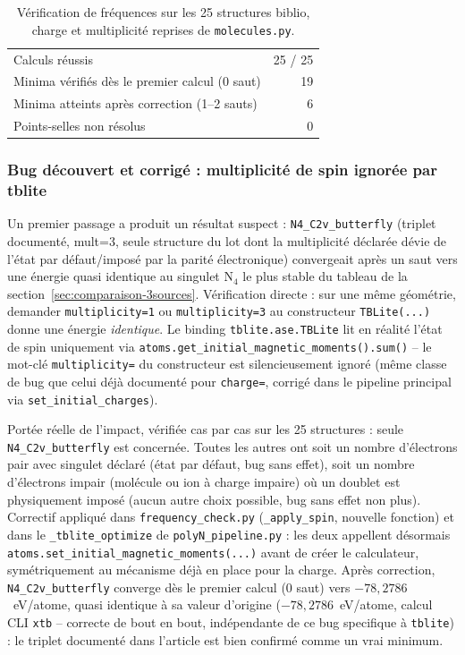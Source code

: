 \documentclass[11pt,a4paper]{article}
\begin{document}
\begin{table}[H]
\centering
\begin{tabular}{lr}
\toprule
Calculs r\'eussis & 25 / 25 \\
Minima v\'erifi\'es d\`es le premier calcul (0 saut) & 19 \\
Minima atteints apr\`es correction (1--2 sauts) & 6 \\
Points-selles non r\'esolus & 0 \\
\bottomrule
\end{tabular}
\caption{V\'erification de fr\'equences sur les 25 structures biblio,
charge et multiplicit\'e reprises de \texttt{molecules.py}.}
\label{tab:freq-biblio}
\end{table}

\subsubsection{Bug d\'ecouvert et corrig\'e : multiplicit\'e de spin ignor\'ee par tblite}
\label{sssec:bug-multiplicity}

Un premier passage a produit un r\'esultat suspect : \texttt{N4\_C2v\_butterfly}
(triplet document\'e, mult=3, seule structure du lot dont la multiplicit\'e
d\'eclar\'ee d\'evie de l'\'etat par d\'efaut/impos\'e par la parit\'e
\'electronique) convergeait apr\`es un saut vers une \'energie quasi
identique au singulet N$_4$ le plus stable du tableau de la
section~\ref{sec:comparaison-3sources}. V\'erification directe : sur une
m\^eme g\'eom\'etrie, demander \texttt{multiplicity=1} ou
\texttt{multiplicity=3} au constructeur \texttt{TBLite(...)} donne une
\'energie \emph{identique}. Le binding \texttt{tblite.ase.TBLite} lit en
r\'ealit\'e l'\'etat de spin uniquement via
\texttt{atoms.get\_initial\_magnetic\_moments().sum()} -- le mot-cl\'e
\texttt{multiplicity=} du constructeur est silencieusement ignor\'e (m\^eme
classe de bug que celui d\'ej\`a document\'e pour \texttt{charge=}, corrig\'e
dans le pipeline principal via \texttt{set\_initial\_charges}).

Port\'ee r\'eelle de l'impact, v\'erifi\'ee cas par cas sur les 25
structures : seule \texttt{N4\_C2v\_butterfly} est concern\'ee. Toutes les
autres ont soit un nombre d'\'electrons pair avec singulet d\'eclar\'e (\'etat
par d\'efaut, bug sans effet), soit un nombre d'\'electrons impair
(mol\'ecule ou ion \`a charge impaire) o\`u un doublet est physiquement
impos\'e (aucun autre choix possible, bug sans effet non plus). Correctif
appliqu\'e dans \texttt{frequency\_check.py} (\texttt{\_apply\_spin}, nouvelle
fonction) et dans le \texttt{\_tblite\_optimize} de
\texttt{polyN\_pipeline.py} : les deux appellent d\'esormais
\texttt{atoms.set\_initial\_magnetic\_moments(...)} avant de cr\'eer le
calculateur, sym\'etriquement au m\'ecanisme d\'ej\`a en place pour la
charge. Apr\`es correction, \texttt{N4\_C2v\_butterfly} converge d\`es le
premier calcul (0 saut) vers $-78{,}2786$~eV/atome, quasi identique \`a sa
valeur d'origine ($-78{,}2786$~eV/atome, calcul CLI \texttt{xtb} --
correcte de bout en bout, ind\'ependante de ce bug specifique \`a
\texttt{tblite}) : le triplet document\'e dans l'article est bien confirm\'e
comme un vrai minimum.
\end{document}
